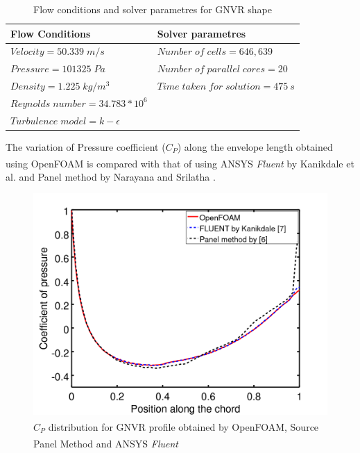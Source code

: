 \begin{table}[H]
	\caption{Flow conditions and solver parametres for GNVR shape}
	\label{Flow conditions and solver parametres for GNVR shape}
	\centering
	\begin{tabular}{ll}
		\hline \hline
		Flow Conditions & Solver parametres  \\ \hline \hline
		
		$ Velocity = 50.339 \; m/s$ & $Number \; of \; cells = 646,639$    \\  
		$ Pressure = 101325 \; Pa $ & $ Number \; of \; parallel \; cores = 20 $     \\
		$ Density = 1.225 \; kg/m^{3} $ & $ Time \; taken \; for \; solution = 475~s  $    \\
		$ Reynolds \; number = 34.783 * 10^{6} $ &    \\
		$ Turbulence \; model = k - \epsilon $ &     \\
		\hline
	\end{tabular}
\end{table}





The variation of Pressure coefficient ($C_{P}$) along the envelope length obtained using OpenFOAM\textsuperscript{\textregistered} is compared with that of using ANSYS\textsuperscript{\textregistered} \textit{Fluent} by Kanikdale et al. \cite{kanikdale2004multi} and Panel method by Narayana and Srilatha \cite{gnvr2000}. 

\begin{figure}[H]
	\centering
	\includegraphics[width=270 pt]{rnd/GNVR_cp.png}
	\caption{$C_{P}$ distribution for GNVR profile obtained by OpenFOAM\textsuperscript{\textregistered}, Source Panel Method \cite{gnvr2000} and ANSYS\textsuperscript{\textregistered} \textit{Fluent} \cite{kanikdale2004multi}}
	\label{fig:GNVR pressure distribution} %
\end{figure}

